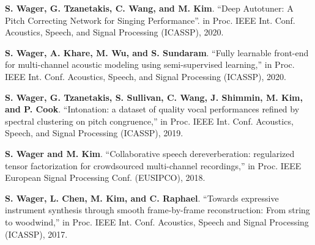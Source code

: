 \hspace{\parindent}\textbf{S. Wager, G. Tzanetakis, C. Wang, and M. Kim}. ``Deep Autotuner: A Pitch Correcting Network for Singing Performance''. in Proc. IEEE Int. Conf. Acoustics, Speech, and Signal Processing (ICASSP), 2020.

\textbf{S. Wager, A. Khare, M. Wu, and S. Sundaram}. ``Fully learnable front-end for multi-channel acoustic modeling using semi-supervised learning,'' in Proc. IEEE Int. Conf. Acoustics, Speech, and Signal Processing (ICASSP), 2020.

\textbf{S. Wager, G. Tzanetakis, S. Sullivan, C. Wang, J. Shimmin, M. Kim, and P. Cook}. ``Intonation: a dataset of quality vocal performances refined by spectral clustering on pitch congruence,'' in Proc. IEEE Int. Conf. Acoustics, Speech, and Signal Processing (ICASSP), 2019.

\textbf{S. Wager and M. Kim}. ``Collaborative speech dereverberation: regularized tensor factorization for crowdsourced multi-channel recordings,'' in Proc. IEEE European Signal Processing Conf. (EUSIPCO), 2018.

\textbf{S. Wager, L. Chen, M. Kim, and C. Raphael}. ``Towards expressive instrument synthesis through smooth frame-by-frame reconstruction: From string to woodwind,'' in Proc. IEEE Int. Conf. Acoustics, Speech and Signal Processing (ICASSP), 2017.




